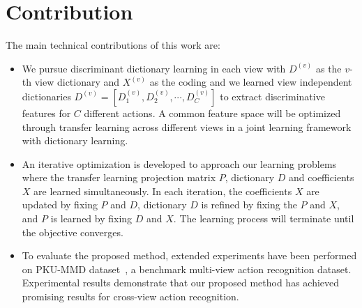 \section{Contribution}
The main technical contributions of this work are:
\begin{itemize}
\item We pursue discriminant dictionary learning in each view with $D^{(v)}$ as the $v$-th view dictionary and  $X^{(v)}$ as the coding and we learned view independent dictionaries $D^{(v)} = [D_1^{(v)},D_2^{(v)},\cdots,D_C^{(v)}]$ to extract discriminative features for $C$ different actions. A common feature space will be optimized through transfer learning across different views in a joint learning framework with dictionary learning.
\item An iterative optimization is developed to approach our learning problems where the transfer learning projection matrix $P$, dictionary $D$ and coefficients $X$ are learned simultaneously. In each iteration, the coefficients $X$ are updated by fixing $P$ and $D$, dictionary $D$ is refined by fixing the $P$ and $X$, and $P$ is learned by fixing $D$ and $X$. The learning process will terminate until the objective converges.
\item To evaluate the proposed method, extended experiments have been performed on PKU-MMD dataset~\cite{liu2017pku}, a benchmark multi-view action recognition dataset. Experimental results demonstrate that our proposed method has achieved promising results for cross-view action recognition.
\end{itemize}

